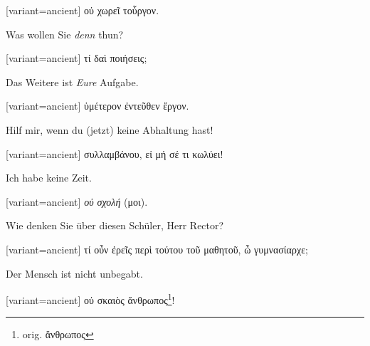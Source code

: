 \switchcolumn

\begin{greek}[variant=ancient]%
οὐ χωρεῖ τοὖργον.

\end{greek}%
\switchcolumn*

Was wollen Sie \emph{denn }thun?

\switchcolumn

\begin{greek}[variant=ancient]%
τί δαὶ ποιήσεις;

\end{greek}%
\switchcolumn*

Das Weitere ist \emph{Eure} Aufgabe.

\switchcolumn

\begin{greek}[variant=ancient]%
ὑμέτερον ἐντεῦθεν ἔργον.

\end{greek}%
\switchcolumn*

Hilf mir, wenn du (jetzt) keine Abhaltung hast!

\switchcolumn

\begin{greek}[variant=ancient]%
συλλαμβάνου, εἰ μή σέ τι κωλύει!

\end{greek}%
\switchcolumn*

Ich habe keine Zeit.

\switchcolumn

\begin{greek}[variant=ancient]%
\emph{οὐ σχολή} (μοι).

\end{greek}%
Wie denken Sie über diesen Schüler, Herr Rector? 

\switchcolumn

\begin{greek}[variant=ancient]%
τί οὖν ἐρεῖς περὶ τούτου τοῦ μαθητοῦ, ὦ γυμνασίαρχε;

\end{greek}%
\switchcolumn*

Der Mensch ist nicht unbegabt. 

\switchcolumn

\begin{greek}[variant=ancient]%
οὐ σκαιὸς ἄνθρωπος\footnote{orig. ἅνθρωπος}!

\end{greek}%
\switchcolumn*

